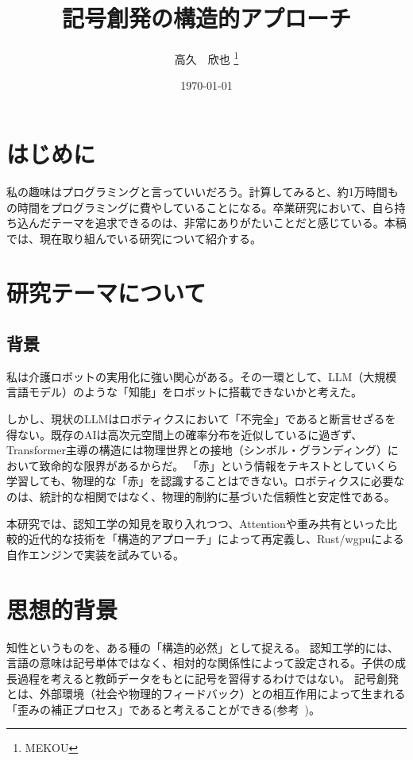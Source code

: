 \documentclass[a4j, twocolumn]{article}
\begin{document}
\title{記号創発の構造的アプローチ}
\author{高久　欣也 \thanks{MEKOU}}
\date{\today{}}

\maketitle

\section{はじめに}
私の趣味はプログラミングと言っていいだろう。計算してみると、約1万時間もの時間をプログラミングに費やしていることになる。卒業研究において、自ら持ち込んだテーマを追求できるのは、非常にありがたいことだと感じている。本稿では、現在取り組んでいる研究について紹介する。

\section{研究テーマについて}
\subsection{背景}
私は介護ロボットの実用化に強い関心がある。その一環として、LLM（大規模言語モデル）のような「知能」をロボットに搭載できないかと考えた。

しかし、現状のLLMはロボティクスにおいて「不完全」であると断言せざるを得ない。既存のAIは高次元空間上の確率分布を近似しているに過ぎず、Transformer主導の構造には物理世界との接地（シンボル・グランディング）において致命的な限界があるからだ。
「赤」という情報をテキストとしていくら学習しても、物理的な「赤」を認識することはできない。ロボティクスに必要なのは、統計的な相関ではなく、物理的制約に基づいた信頼性と安定性である。

本研究では、認知工学の知見を取り入れつつ、Attentionや重み共有といった比較的近代的な技術を「構造的アプローチ」によって再定義し、Rust/wgpuによる自作エンジンで実装を試みている。

\section{思想的背景}
知性というものを、ある種の「構造的必然」として捉える。
認知工学的には、言語の意味は記号単体ではなく、相対的な関係性によって設定される。子供の成長過程を考えると教師データをもとに記号を習得するわけではない。
記号創発とは、外部環境（社会や物理的フィードバック）との相互作用によって生まれる「歪みの補正プロセス」であると考えることができる(参考~\cite{ref1})。
\end{document}
